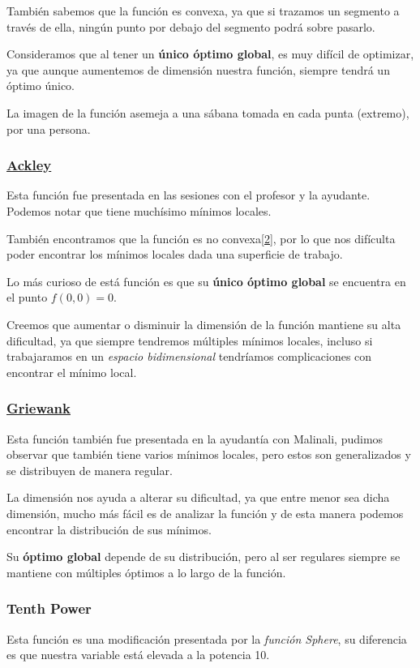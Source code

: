 \documentclass{article}
\begin{document}
También sabemos que la función es convexa, ya que si trazamos un segmento a través de ella, ningún punto por debajo del segmento podrá
sobre pasarlo.

Consideramos que al tener un \textbf{único óptimo global}, es muy difícil de optimizar, ya que aunque aumentemos de dimensión nuestra función,
siempre tendrá un óptimo único.

La imagen de la función asemeja a una sábana tomada en cada punta (extremo), por una persona.

\subsubsection*{\href{https://www.sfu.ca/~ssurjano/ackley.html}{Ackley}}
Esta función fue presentada en las sesiones con el profesor y la ayudante. Podemos notar que tiene muchísimo mínimos locales.

También encontramos que la función es no convexa\href{https://en.wikipedia.org/wiki/Ackley_function}{[2]}, por lo que nos difículta poder encontrar
los mínimos locales dada una superficie de trabajo.

Lo más curioso de está función es que su \textbf{único óptimo global} se encuentra en el punto $f(0,0)=0$.

Creemos que aumentar o disminuir la dimensión de la función mantiene su alta dificultad, ya que siempre tendremos múltiples mínimos locales,
incluso si trabajaramos en un \textit{espacio bidimensional} tendríamos complicaciones con encontrar el mínimo local.

\subsubsection*{\href{https://www.sfu.ca/~ssurjano/griewank.html}{Griewank}}

Esta función también fue presentada en la ayudantía con Malinali, pudimos observar que también tiene varios mínimos locales, pero
estos son generalizados y se distribuyen de manera regular.

La dimensión nos ayuda a alterar su dificultad, ya que entre menor sea dicha dimensión, mucho más fácil es de analizar la función y de
esta manera podemos encontrar la distribución de sus mínimos.

Su \textbf{óptimo global} depende de su distribución, pero al ser regulares siempre se mantiene con múltiples óptimos a lo largo de la función.

\subsubsection*{Tenth Power}
Esta función es una modificación presentada por la \textit{función Sphere}, su diferencia es que nuestra variable está elevada a la potencia 10.
\end{document}
